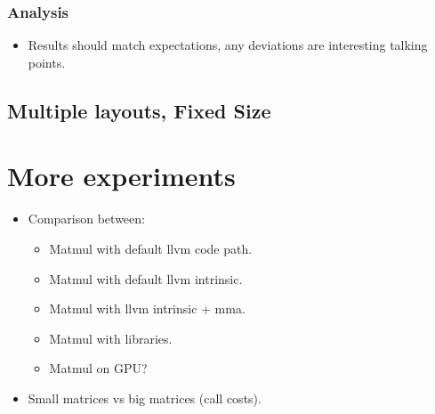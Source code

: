 \documentclass[\main/thesis.tex]{subfiles}
\begin{document}
\subsubsection{Analysis}
\begin{itemize}
  \item Results should match expectations, any deviations are interesting talking points.
\end{itemize}

\subsection{Multiple layouts, Fixed Size}

\section{More experiments}
\begin{itemize}
  \item Comparison between:
  \begin{itemize}
    \item Matmul with default llvm code path.
    \item Matmul with default llvm intrinsic.
    \item Matmul with llvm intrinsic + mma.
    \item Matmul with libraries.
    \item Matmul on GPU?
  \end{itemize}
\end{itemize}

\begin{itemize}
  \item Small matrices vs big matrices (call costs).
\end{itemize}
\end{document}
